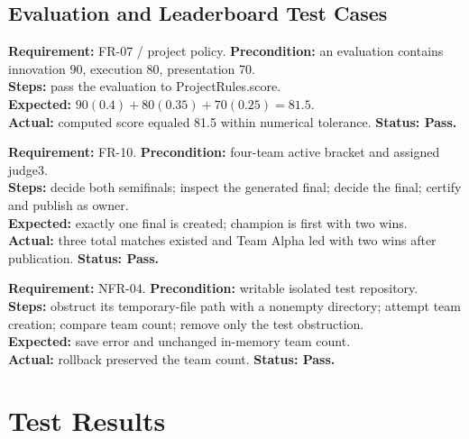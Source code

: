 \documentclass[12pt]{article}
\begin{document}
\subsection{Evaluation and Leaderboard Test Cases}
\begin{contentbox}
\textbf{Requirement:} FR-07 / project policy. \textbf{Precondition:} an evaluation contains innovation 90, execution 80, presentation 70.\\
\textbf{Steps:} pass the evaluation to ProjectRules.score.\\
\textbf{Expected:} $90(0.4)+80(0.35)+70(0.25)=81.5$.\\
\textbf{Actual:} computed score equaled 81.5 within numerical tolerance. \textbf{Status: Pass.}
\end{contentbox}
\begin{contentbox}
\textbf{Requirement:} FR-10. \textbf{Precondition:} four-team active bracket and assigned judge3.\\
\textbf{Steps:} decide both semifinals; inspect the generated final; decide the final; certify and publish as owner.\\
\textbf{Expected:} exactly one final is created; champion is first with two wins.\\
\textbf{Actual:} three total matches existed and Team Alpha led with two wins after publication. \textbf{Status: Pass.}
\end{contentbox}
\begin{contentbox}
\textbf{Requirement:} NFR-04. \textbf{Precondition:} writable isolated test repository.\\
\textbf{Steps:} obstruct its temporary-file path with a nonempty directory; attempt team creation; compare team count; remove only the test obstruction.\\
\textbf{Expected:} save error and unchanged in-memory team count.\\
\textbf{Actual:} rollback preserved the team count. \textbf{Status: Pass.}
\end{contentbox}

\section{Test Results}
\end{document}
